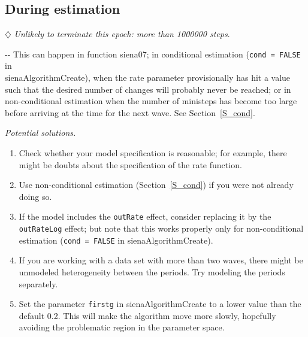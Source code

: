 \documentclass[a4paper,fleqn,11pt]{article}
\makeatletter
\newcommand{\+}{\, + \,}
\newcommand{\sfn}[1]{\textsf{#1}}
\newenvironment{indentation}[2]
{\par \setlength{\leftmargin}{#1}       \setlength{\rightmargin}{#2}
  \advance\linewidth -\leftmargin       \advance\linewidth -\rightmargin
  \advance\@totalleftmargin\leftmargin  \@setpar{{\@@par}}%
  \parshape 1 \@totalleftmargin         \linewidth \ignorespaces}{\par}
\makeatother
\begin{document}
\subsection{During estimation}

$\diamondsuit$
\emph{Unlikely to terminate this epoch: more than 1000000 steps}.
\medskip

\begin{indentation}{0.04\textwidth}{0pt}
\noindent
This can happen in function \textsf{siena07};
in conditional estimation (\texttt{cond = FALSE} in\\
 \textsf{sienaAlgorithmCreate}),
when the rate parameter provisionally has hit a value such that the
desired number of changes will probably never be reached;
or in non-conditional estimation when the number of ministeps has become
too large before arriving at the time for the next wave.
See Section~\ref{S_cond}.

\medskip

\noindent
\emph{Potential solutions.}
\begin{enumerate}
\item Check whether your model specification is reasonable;
    for example, there might be doubts about the specification of the
    rate function.
\item  Use non-conditional estimation (Section~\ref{S_cond}) if you were not
   already doing so.
\item If the model includes the \texttt{outRate} effect, consider
    replacing it by the \texttt{outRateLog} effect;
    but note that this works properly only for non-conditional estimation
    (\texttt{cond = FALSE} in \sfn{sienaAlgorithmCreate}).
\item If you are working with a data set with more than two waves, there might
   be unmodeled heterogeneity between the periods. Try modeling the periods
   separately.
\item Set the parameter \texttt{firstg} in \textsf{sienaAlgorithmCreate} to a
   lower value than the default 0.2.
   This will make the algorithm move more slowly, hopefully avoiding the problematic region
   in the parameter space.


\end{enumerate}
\end{indentation}
\end{document}
